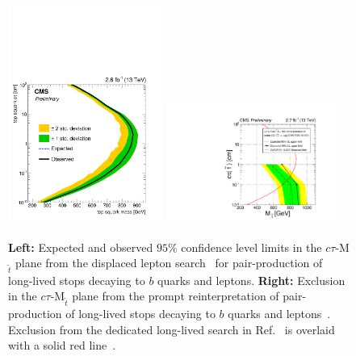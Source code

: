 \begin{figure}[t]
\begin{center}
\includegraphics[width=0.45\textwidth,angle=0]{ch5-figures/CMS-PAS-EXO-16-022_Figure_004.pdf}
\includegraphics[width=0.5\textwidth,angle=0]{ch5-figures/CMS-PAS-EXO-16-007_Figure-aux_001.pdf}
\end{center}
\caption{{\bf Left:} Expected and observed $95\%$ confidence level limits in the $c\tau$-M$_{\tilde{t}}$ plane from the displaced lepton search~\cite{CMS-PAS-EXO-16-022} for pair-production of long-lived stops decaying to $b$ quarks and leptons. {\bf Right:} Exclusion in the $c\tau$-M$_{\tilde{t}}$ plane from the prompt reinterpretation of pair-production of long-lived stops decaying to $b$ quarks and leptons~\cite{CMS-PAS-EXO-16-007}. Exclusion from the dedicated long-lived search in Ref.~\cite{CMS-PAS-EXO-16-022} is overlaid with a solid red line~\cite{CMS-EXO-16-007url}.}
\label{fig:exo-16}
\end{figure}




